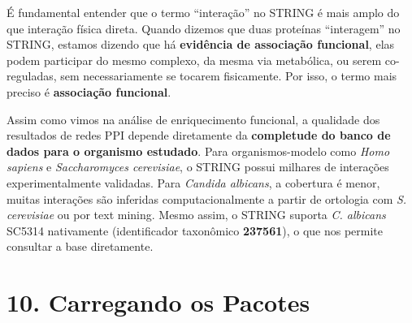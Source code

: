 \documentclass[
  letterpaper,
  DIV=11,
  numbers=noendperiod]{scrreprt}
\begin{document}
\begin{tcolorbox}[enhanced jigsaw, arc=.35mm, bottomrule=.15mm, bottomtitle=1mm, breakable, colback=white, colbacktitle=quarto-callout-important-color!10!white, colframe=quarto-callout-important-color-frame, coltitle=black, left=2mm, leftrule=.75mm, opacityback=0, opacitybacktitle=0.6, rightrule=.15mm, title=\textcolor{quarto-callout-important-color}{\faExclamation}\hspace{0.5em}{Interações ≠ Interações Físicas}, titlerule=0mm, toprule=.15mm, toptitle=1mm]

É fundamental entender que o termo ``interação'' no STRING é mais amplo
do que interação física direta. Quando dizemos que duas proteínas
``interagem'' no STRING, estamos dizendo que há \textbf{evidência de
associação funcional}, elas podem participar do mesmo complexo, da mesma
via metabólica, ou serem co-reguladas, sem necessariamente se tocarem
fisicamente. Por isso, o termo mais preciso é \textbf{associação
funcional}.

\end{tcolorbox}

\begin{tcolorbox}[enhanced jigsaw, arc=.35mm, bottomrule=.15mm, bottomtitle=1mm, breakable, colback=white, colbacktitle=quarto-callout-note-color!10!white, colframe=quarto-callout-note-color-frame, coltitle=black, left=2mm, leftrule=.75mm, opacityback=0, opacitybacktitle=0.6, rightrule=.15mm, title=\textcolor{quarto-callout-note-color}{\faInfo}\hspace{0.5em}{Ponto Importante --- Bancos de Dados Curados e Organismos Não-Modelo}, titlerule=0mm, toprule=.15mm, toptitle=1mm]

Assim como vimos na análise de enriquecimento funcional, a qualidade dos
resultados de redes PPI depende diretamente da \textbf{completude do
banco de dados para o organismo estudado}. Para organismos-modelo como
\emph{Homo sapiens} e \emph{Saccharomyces cerevisiae}, o STRING possui
milhares de interações experimentalmente validadas. Para \emph{Candida
albicans}, a cobertura é menor, muitas interações são inferidas
computacionalmente a partir de ortologia com \emph{S. cerevisiae} ou por
text mining. Mesmo assim, o STRING suporta \emph{C. albicans} SC5314
nativamente (identificador taxonômico \textbf{237561}), o que nos
permite consultar a base diretamente.

\end{tcolorbox}

\section{10. Carregando os Pacotes}\label{carregando-os-pacotes-2}
\end{document}
